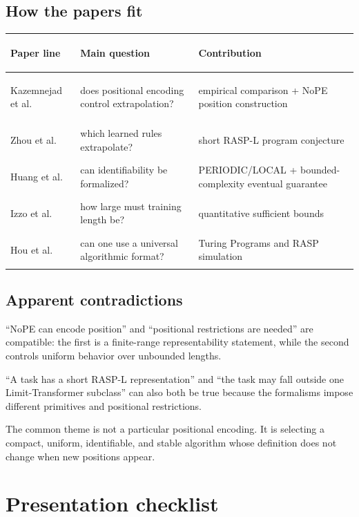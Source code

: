 \documentclass[11pt,a4paper,oneside,openany]{memoir}
\theoremstyle{definition}
\begin{document}
\section{How the papers fit}
\begin{center}\small
\begin{tabularx}{\textwidth}{>{\bfseries\raggedright\arraybackslash}p{}XX}
\toprule
Paper line & Main question & Contribution\\
\midrule
Kazemnejad et al. & does positional encoding control extrapolation? & empirical comparison + NoPE position construction\\
Zhou et al. & which learned rules extrapolate? & short RASP-L program conjecture\\
Huang et al. & can identifiability be formalized? & PERIODIC/LOCAL + bounded-complexity eventual guarantee\\
Izzo et al. & how large must training length be? & quantitative sufficient bounds\\
Hou et al. & can one use a universal algorithmic format? & Turing Programs and RASP simulation\\
\bottomrule
\end{tabularx}
\end{center}

\section{Apparent contradictions}
``NoPE can encode position'' and ``positional restrictions are needed'' are compatible: the first is a finite-range representability statement, while the second controls uniform behavior over unbounded lengths.

``A task has a short RASP-L representation'' and ``the task may fall outside one Limit-Transformer subclass'' can also both be true because the formalisms impose different primitives and positional restrictions.

\begin{presentbox}
The common theme is not a particular positional encoding.  It is selecting a compact, uniform, identifiable, and stable algorithm whose definition does not change when new positions appear.
\end{presentbox}

\chapter{Presentation checklist}
\end{document}
